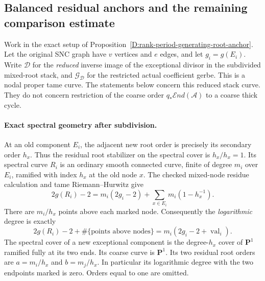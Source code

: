 \subsection*{Balanced residual anchors and the remaining comparison estimate}

Work in the exact setup of Proposition~\ref{D:rank-period-generating-root-anchor}.
Let the original SNC graph have $v$ vertices and $e$ edges, and let
$g_i=g(E_i)$. Write $\mathcal D$ for the \emph{reduced} inverse image
of the exceptional divisor in the subdivided mixed-root stack, and
$\mathcal G_{\mathcal D}$ for the restricted actual coefficient gerbe.
This is a nodal proper tame curve. The statements below concern this
reduced stack curve. They do not concern restriction of the coarse
order $q_*\mathcal End(\mathcal A)$ to a coarse thick cycle.

\paragraph{Exact spectral geometry after subdivision.}
At an old component $E_i$, the adjacent new root order is precisely
its secondary order $h_x$. Thus the residual root stabilizer on the
spectral cover is $h_x/h_x=1$. Its spectral curve $R_i$ is an ordinary
smooth connected curve, finite of degree $m_i$ over $E_i$, ramified
with index $h_x$ at the old node $x$. The checked mixed-node residue
calculation and tame Riemann--Hurwitz give
\[
  2g(R_i)-2=m_i(2g_i-2)+\sum_{x\in E_i}m_i(1-h_x^{-1}).
\]
There are $m_i/h_x$ points above each marked node. Consequently the
\emph{logarithmic} degree is exactly
\[
  2g(R_i)-2+\#\{\text{points above nodes}\}
       =m_i(2g_i-2+\operatorname{val}_i).
\]
The spectral cover of a new exceptional component is the degree-$h_x$
cover of $\mathbf P^1$ ramified fully at its two ends. Its coarse curve
is $\mathbf P^1$. Its two residual root orders are
$a=m_i/h_x$ and $b=m_j/h_x$. In particular its logarithmic degree
with the two endpoints marked is zero. Orders equal to one are omitted.

